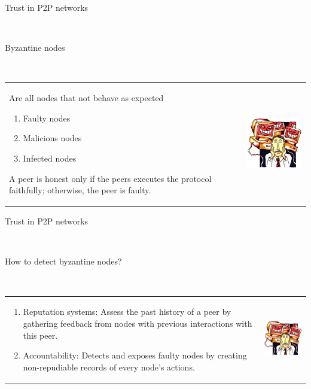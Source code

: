 \documentclass[12pt]{beamer}
\renewcommand{\frametitle}[1]{\vspace{0.2cm}\begin{huge}#1\end{huge}\\}
\renewcommand{\framesubtitle}[1]{\vspace{0.4cm} \hspace{0.4cm}\begin{large}#1\end{large}\\}
\begin{document}
  \begin{frame}
  \frametitle{Trust in P2P networks}
  \framesubtitle{Byzantine nodes}
  \begin{table}
  \begin{tabular}{p{7cm}p{3cm}}
  Are all nodes that not behave as expected
  \begin{enumerate}
      \item Faulty nodes
      \item Malicious nodes
      \item Infected nodes
  \end{enumerate}
    A peer is honest only if the peers executes the protocol faithfully;
    otherwise, the peer is faulty.
  &
  \vspace{1.5cm}
  \includegraphics[width=4cm]{../../presentacion/img/malicious}\\
  \end{tabular}
  \end{table}
  \end{frame}
  
  \begin{frame}
  \frametitle{Trust in P2P networks}
  \framesubtitle{How to detect byzantine nodes?}
  \begin{table}
  \begin{tabular}{p{7cm}p{3cm}}
  \begin{enumerate}
      \item{Reputation systems:} Assess the past history of a
  peer by gathering feedback from nodes with previous interactions with this
  peer.
      \item{Accountability:} Detects and exposes faulty nodes by
  creating non-repudiable records of every node’s actions.
  \end{enumerate}
  &
  \vspace{1.5cm}
  \includegraphics[width=4cm]{../../presentacion/img/malicious}\\
  \end{tabular}
  \end{table}
  \end{frame}
\end{document}
